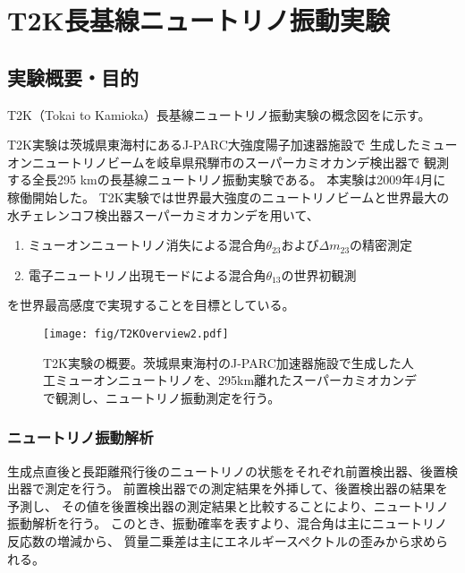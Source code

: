 \chapter{T2K長基線ニュートリノ振動実験}

\section{実験概要・目的}
T2K（Tokai to Kamioka）長基線ニュートリノ振動実験の概念図をに示す。

T2K実験\cite{jhfnu}は茨城県東海村にあるJ-PARC大強度陽子加速器施設で
生成したミューオンニュートリノビームを岐阜県飛騨市のスーパーカミオカンデ検出器で
観測する全長295 kmの長基線ニュートリノ振動実験である。
本実験は2009年4月に稼働開始した。
T2K実験では世界最大強度のニュートリノビームと世界最大の水チェレンコフ検出器スーパーカミオカンデを用いて、

\begin{enumerate}
\item ミューオンニュートリノ消失による混合角$\theta_{23}$および$\Delta m_{23}$の精密測定
\item 電子ニュートリノ出現モードによる混合角$\theta_{13}$の世界初観測
\end{enumerate}

を世界最高感度で実現することを目標としている。

\begin{figure}[htbp]
\centering
\texttt{[image: fig/T2KOverview2.pdf]}
\caption[T2K実験の概要]{T2K実験の概要。茨城県東海村のJ-PARC加速器施設で生成した人工ミューオンニュートリノを、295km離れたスーパーカミオカンデで観測し、ニュートリノ振動測定を行う。}
\label{T2KOverview}
\end{figure}

\subsection{ニュートリノ振動解析}

生成点直後と長距離飛行後のニュートリノの状態をそれぞれ前置検出器、後置検出器で測定を行う。
前置検出器での測定結果を外挿して、後置検出器の結果を予測し、
その値を後置検出器の測定結果と比較することにより、ニュートリノ振動解析を行う。
このとき、振動確率を表すより、混合角は主にニュートリノ反応数の増減から、
質量二乗差は主にエネルギースペクトルの歪みから求められる。

